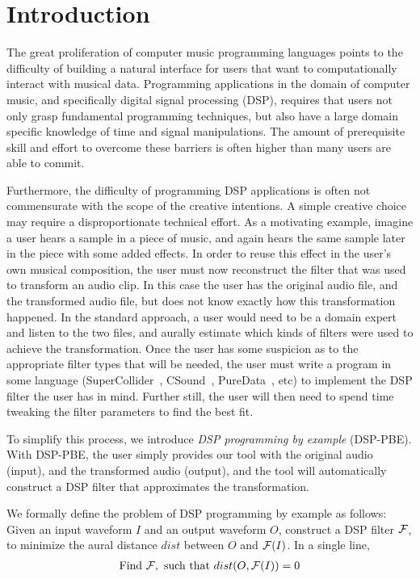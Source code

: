 \section{Introduction}
\label{sec:intro}

The great proliferation of computer music programming languages points to the difficulty of building a natural interface for users that want to computationally interact with musical data.
Programming applications in the domain of computer music, and specifically digital signal processing (DSP), requires that users not only grasp fundamental programming techniques, but also have a large domain specific knowledge of time and signal manipulations.
The amount of prerequisite skill and effort to overcome these barriers is often higher than many users are able to commit.

Furthermore, the difficulty of programming DSP applications is often not commensurate with the scope of the creative intentions.
A simple creative choice may require a disproportionate technical effort.
As a motivating example, imagine a user hears a sample in a piece of music, and again hears the same sample later in the piece with some added effects.
In order to reuse this effect in the user's own musical composition, the user must now reconstruct the filter that was used to transform an audio clip. 
In this case the user has the original audio file, and the transformed audio file, but does not know exactly how this transformation happened.
In the standard approach, a user would need to be a domain expert and listen to the two files, and aurally estimate which kinds of filters were used to achieve the transformation. 
Once the user has some suspicion as to the appropriate filter types that will be needed, the user must write a program in some language (SuperCollider~\cite{supercollider}, CSound~\cite{csound}, PureData~\cite{puredata}, etc) to implement the DSP filter the user has in mind. 
Further still, the user will then need to spend time tweaking the filter parameters to find the best fit. 


To simplify this process, we introduce \textit{DSP programming by example} (DSP-PBE). 
With DSP-PBE, the user simply provides our tool with the original audio (input), and the transformed audio (output), and the tool will automatically construct a DSP filter that approximates the transformation.

We formally define the problem of DSP programming by example as follows:
Given an input waveform $I$ and an output waveform $O$, construct a DSP filter $\mathcal{F}$, to minimize the aural distance $dist$ between $O$ and $\mathcal{F}(I)$.
In a single line,  
%
\begin{align*}
\text{Find } \mathcal{F}, \text{ such that } dist(O,\mathcal{F}(I))=0
\end{align*}



